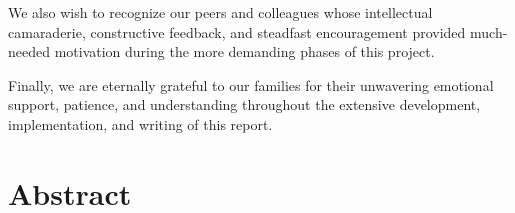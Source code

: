 \medskip

We also wish to recognize our peers and colleagues whose intellectual camaraderie, constructive feedback, and steadfast encouragement provided much-needed motivation during the more demanding phases of this project.

\medskip

Finally, we are eternally grateful to our families for their unwavering emotional support, patience, and understanding throughout the extensive development, implementation, and writing of this report.

\clearpage

\part*{Abstract}
\clearpage